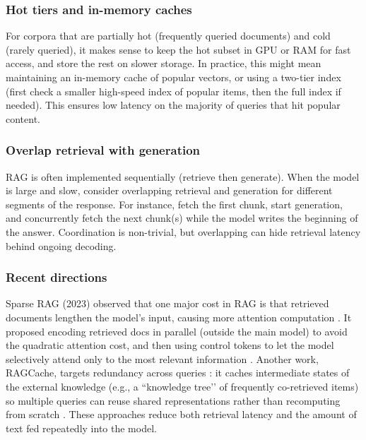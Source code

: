 \subsubsection{Hot tiers and in-memory caches}
For corpora that are partially hot (frequently queried documents) and cold (rarely queried), it makes sense to keep the hot subset in GPU or RAM for fast access, and store the rest on slower storage. In practice, this might mean maintaining an in-memory cache of popular vectors, or using a two-tier index (first check a smaller high-speed index of popular items, then the full index if needed). This ensures low latency on the majority of queries that hit popular content.

\subsubsection{Overlap retrieval with generation}
RAG is often implemented sequentially (retrieve then generate). When the model is large and slow, consider overlapping retrieval and generation for different segments of the response. For instance, fetch the first chunk, start generation, and concurrently fetch the next chunk(s) while the model writes the beginning of the answer. Coordination is non-trivial, but overlapping can hide retrieval latency behind ongoing decoding.

\subsubsection{Recent directions}
Sparse RAG (2023) observed that one major cost in RAG is that retrieved documents lengthen the model’s input, causing more attention computation \cite{pope2023exegpt}. It proposed encoding retrieved docs in parallel (outside the main model) to avoid the quadratic attention cost, and then using control tokens to let the model selectively attend only to the most relevant information \cite{pope2023exegpt}. Another work, RAGCache, targets redundancy across queries \cite{pope2023exegpt}: it caches intermediate states of the external knowledge (e.g., a ``knowledge tree’’ of frequently co-retrieved items) so multiple queries can reuse shared representations rather than recomputing from scratch \cite{pope2023exegpt}. These approaches reduce both retrieval latency and the amount of text fed repeatedly into the model.

